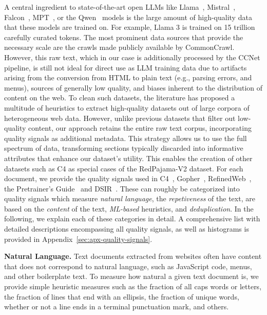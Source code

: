 \documentclass{article}
\begin{document}
A central ingredient to state-of-the-art open LLMs like Llama~\cite{touvron2023allama,touvron2023bllama}, Mistral~\cite{jiang2023mistral}, Falcon~\cite{almazrouei2023falcon}, MPT~\cite{MosaicML2023Introducing}, or the Qwen~\cite{bai2023qwen} models is the large amount of high-quality data that these models are trained on. 
For example, Llama 3 is trained on 15 trillion carefully curated tokens. The most prominent data sources that provide the necessary scale are the crawls made publicly available by CommonCrawl. 
However, this raw text, which in our case is additionally processed by the CCNet pipeline, is still not ideal for direct use as LLM training data due to artifacts arising from the conversion from HTML to plain text (e.g., parsing errors, and menus), sources of generally low quality, and biases inherent to the distribution of content on the web.
To clean such datasets, the literature has proposed a multitude of heuristics to extract high-quality datasets out of large corpora of heterogeneous web data. However, unlike previous datasets that filter out low-quality content, our approach retains the entire raw text corpus, incorporating quality signals as additional metadata. This strategy allows us to use the full spectrum of data, transforming sections typically discarded into informative attributes that enhance our dataset's utility. This enables the creation of other datasets such as C4 as special cases of the RedPajama-V2 dataset.
For each document, we provide the quality signals used in C4~\cite{raffel2020exploring}, Gopher~\cite{rae2021scaling}, RefinedWeb~\cite{penedo2024refinedweb}, the Pretrainer's Guide~\cite{longpre2023pretrainer} and DSIR~\cite{xie2023data}. These can roughly be categorized into quality signals which measure \emph{natural language}, the \emph{repetiveness} of the text, are based on the \emph{content} of the text, \emph{ML-based} heuristics, and \emph{deduplication}. In the following, we explain each of these categories in detail. A comprehensive list with detailed descriptions encompassing all quality signals, as well as histograms is provided in Appendix~\ref{sec:apx-quality-signals}.

{\bf Natural Language.} Text documents extracted from websites often have content that does not correspond to natural language, such as JavaScript code, menus, and other boilerplate text. To measure how natural a given text document is, we provide simple heuristic measures such as the fraction of all caps words or letters, the fraction of lines that end with an ellipsis, the fraction of unique words, whether or not a line ends in a terminal punctuation mark, and others.
\end{document}
